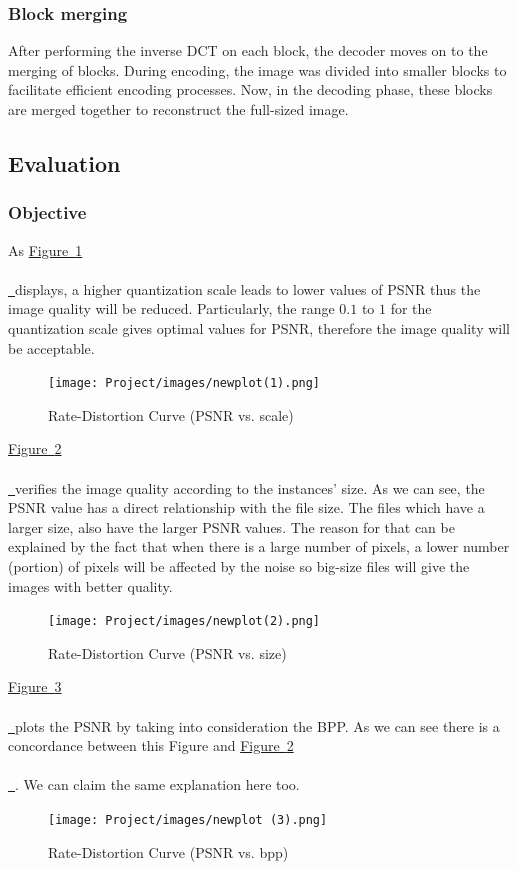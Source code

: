 \documentclass{article}
\newcommand*{\figref}[2][]{%
  \hyperref[{fig:#2}]{%
    Figure~\ref*{fig:#2}%
    \ifx\\#1\\%
    \else
      \,#1%
    \fi
  }%
}
\begin{document}
\subsubsection{Block merging}

After performing the inverse DCT on each block, the decoder moves on to the merging of blocks. During encoding, the image was divided into smaller blocks to facilitate efficient encoding processes. Now, in the decoding phase, these blocks are merged together to reconstruct the full-sized image.

\subsection{Evaluation}
\subsubsection{Objective}

As \figref{scale} displays, a higher quantization scale leads to lower values of PSNR thus the image quality will be reduced. Particularly, the range $0.1$ to $1$ for the quantization scale gives optimal values for PSNR, therefore the image quality will be acceptable.

\begin{figure}[H]
  \centering
  \texttt{[image: Project/images/newplot(1).png]}
  \caption{Rate-Distortion Curve (PSNR vs. scale)}
  \label{fig:scale}
\end{figure}

\figref{size} verifies the image quality according to the instances' size. As we can see, the PSNR value has a direct relationship with the file size. The files which have a larger size, also have the larger PSNR values. 
The reason for that can be explained by the fact that when there is a large number of pixels, a lower number (portion) of pixels will be affected by the noise so big-size files will give the images with better quality.


\begin{figure}[H]
  \centering
  \texttt{[image: Project/images/newplot(2).png]}
  \caption{Rate-Distortion Curve (PSNR vs. size)}
  \label{fig:size}
\end{figure}

\figref{bpp} plots the PSNR by taking into consideration the BPP. As we can see there is a concordance between this Figure and \figref{size}. We can claim the same explanation here too.

\begin{figure}[H]
  \centering
  \texttt{[image: Project/images/newplot (3).png]}
  \caption{Rate-Distortion Curve (PSNR vs. bpp)}
  \label{fig:bpp}
\end{figure}
\end{document}

